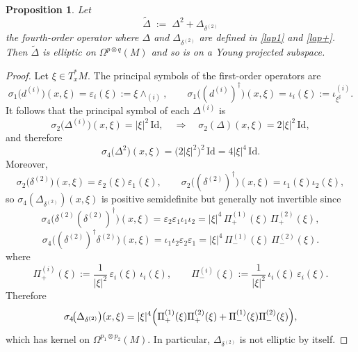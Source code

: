 \documentclass[a4paper,12pt]{article}
\newtheorem{Proposition}[Theorem]{Proposition}
\begin{document}
\begin{Proposition}\label{prop:ellipticity-Delta-tilde}
Let
\begin{equation*}\label{eq:Delta-tilde}
\widetilde{\Delta}\;:=\;\Delta^{2}+\Delta_{\delta^{(2)}}
\end{equation*}
the fourth-order operator where $\Delta$ and $\Delta_{\delta^{(2)}}$ are defined in \eqref{lap1} and \eqref{lap+}. Then $\widetilde{\Delta}$ is elliptic on $\Omega^{p\otimes q}(M)$ and so is on a Young projected subspace.
\end{Proposition}

\begin{proof}
Let $\xi\in T_x^*M$.
The principal symbols of the first-order operators are
\[
\sigma_1\!\bigl(d^{(i)}\bigr)(x,\xi)=\varepsilon_i(\xi):=\xi\wedge_{(i)},\qquad
\sigma_1\!\bigl((d^{(i)})^\dagger\bigr)(x,\xi)=\iota_i(\xi):=\iota^{(i)}_{\xi^\sharp}.
\]
It follows that the principal symbol of each $\Delta^{(i)}$ is
\begin{equation*}\label{eq:principal-symbol-slot-laplacian}
\sigma_2\!\bigl(\Delta^{(i)}\bigr)(x,\xi)=|\xi|^2\,\mathrm{Id},
\quad\Rightarrow\quad
\sigma_2(\Delta)(x,\xi)=2|\xi|^2\,\mathrm{Id},
\end{equation*}
and therefore
\begin{equation*}\label{eq:principal-symbol-Delta-square}
\sigma_4\!\bigl(\Delta^2\bigr)(x,\xi)=\bigl(2|\xi|^2\bigr)^2\,\mathrm{Id}=4|\xi|^4\,\mathrm{Id}.
\end{equation*}
Moreover,
\[
\sigma_2\!\bigl(\delta^{(2)}\bigr)(x,\xi)=\varepsilon_2(\xi)\varepsilon_1(\xi),
\qquad
\sigma_2\!\bigl((\delta^{(2)})^\dagger\bigr)(x,\xi)=\iota_1(\xi)\iota_2(\xi),
\]
so $\sigma_4(\Delta_{\delta^{(2)}})(x,\xi)$ is positive semidefinite but generally not invertible since
\[
\sigma_4\!\bigl(\delta^{(2)}(\delta^{(2)})^\dagger\bigr)(x,\xi)
=\varepsilon_2\varepsilon_1\iota_1\iota_2
=|\xi|^4\,\Pi^{(1)}_{+}(\xi)\,\Pi^{(2)}_{+}(\xi),
\]
\[
\sigma_4\!\bigl((\delta^{(2)})^\dagger\delta^{(2)}\bigr)(x,\xi)
=\iota_1\iota_2\varepsilon_2\varepsilon_1
=|\xi|^4\,\Pi^{(1)}_{-}(\xi)\,\Pi^{(2)}_{-}(\xi).
\]
where
\[
\Pi^{(i)}_{+}(\xi):=\frac{1}{|\xi|^2}\,\varepsilon_i(\xi)\,\iota_i(\xi),\qquad
\Pi^{(i)}_{-}(\xi):=\frac{1}{|\xi|^2}\,\iota_i(\xi)\,\varepsilon_i(\xi).
\]
Therefore
\begin{equation}\label{eq:symbol-Delta-delta2}
\sigma_4\!\bigl(\Delta_{\delta^{(2)}}\bigr)(x,\xi)
=|\xi|^4\Bigl(\Pi^{(1)}_{+}(\xi)\Pi^{(2)}_{+}(\xi)+\Pi^{(1)}_{-}(\xi)\Pi^{(2)}_{-}(\xi)\Bigr),
\end{equation}
which has kernel on $\Omega^{p_1 \otimes p_2}(M)$.
In particular, $\Delta_{\delta^{(2)}}$ is not elliptic by itself.


\end{proof}
\end{document}
